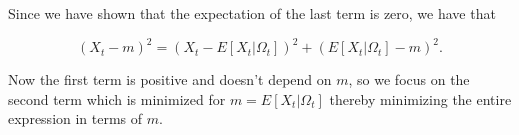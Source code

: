 \documentclass[]{book}
\theoremstyle{definition}
\theoremstyle{definition}
\theoremstyle{definition}
\theoremstyle{remark}
\begin{document}
Since we have shown that the expectation of the last term is zero, we
have that

\[{\left( {{X_t} - m} \right)^2} = {\left( {{X_t} - E\left[ {{X_t}|{\Omega _t}} \right]} \right)^2} + {\left( {E\left[ {{X_t}|{\Omega _t}} \right] - m} \right)^2}.\]

Now the first term is positive and doesn't depend on \(m\), so we focus
on the second term which is minimized for
\(m = E\left[ {{X_t}|{\Omega _t}} \right]\) thereby minimizing the
entire expression in terms of \(m\). \blacksquare


\end{document}
